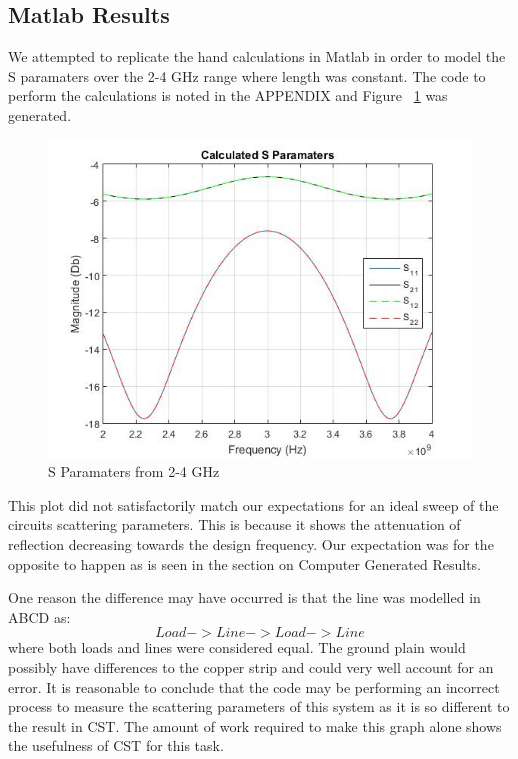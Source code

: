 \documentclass{paper}
\begin{document}
\subsection{Matlab Results}
We attempted to replicate the hand calculations in Matlab in order to model the S paramaters over the 2-4 GHz range where length was constant. The code to perform the calculations is noted in the APPENDIX and Figure ~\ref{fig:matlab_S} was generated.

\begin{figure}[H]
	\centering
	\includegraphics[scale=0.5]{IMG/ideal_sweep}
	\caption{S Paramaters from 2-4 GHz}
	\label{fig:matlab_S}
\end{figure}

This plot did not satisfactorily match our expectations for an ideal sweep of the circuits scattering parameters. This is because it shows the attenuation of reflection decreasing towards the design frequency. Our expectation was for the opposite to happen as is seen in the section on Computer Generated Results.

One reason the difference may have occurred is that the line was modelled in ABCD as:
$$Load->Line->Load->Line$$
where both loads and lines were considered equal. The ground plain would possibly have differences to the copper strip and could very well account for an error. It is reasonable to conclude that the code may be performing an incorrect process to measure the scattering parameters of this system as it is so different to the result in CST. The amount of work required to make this graph alone shows the usefulness of CST for this task.
\end{document}
